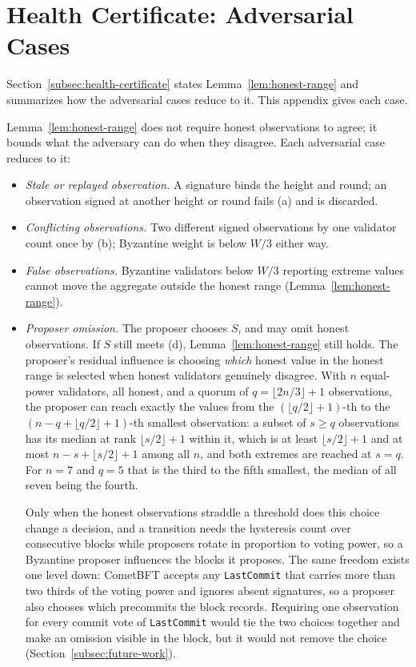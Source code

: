 \section{Health Certificate: Adversarial Cases}
\label{app:certificate}

Section~\ref{subsec:health-certificate} states Lemma~\ref{lem:honest-range} and summarizes how the adversarial cases reduce to it. This appendix gives each case.

Lemma~\ref{lem:honest-range} does not require honest observations to agree; it bounds what the
adversary can do when they disagree. Each adversarial case reduces to it:
\begin{itemize}
  \item \emph{Stale or replayed observation.} A signature binds the height
  and round; an observation signed at another height or round fails (a) and
  is discarded.
  \item \emph{Conflicting observations.} Two different signed observations
  by one validator count once by (b); Byzantine weight is below $W/3$ either
  way.
  \item \emph{False observations.} Byzantine validators below $W/3$
  reporting extreme values cannot move the aggregate outside the honest range
  (Lemma~\ref{lem:honest-range}).
  \item \emph{Proposer omission.} The proposer chooses $S$, and may omit
  honest observations. If $S$ still meets (d), Lemma~\ref{lem:honest-range} still holds. The
  proposer's residual influence is choosing \emph{which} honest value in the
  honest range is selected when honest validators genuinely disagree. With $n$
  equal-power validators, all honest, and a quorum of $q = \lfloor 2n/3 \rfloor + 1$
  observations, the proposer can reach exactly the values from the
  $(\lfloor q/2 \rfloor + 1)$-th to the $(n - q + \lfloor q/2 \rfloor + 1)$-th
  smallest observation: a subset of $s \ge q$ observations has its median at
  rank $\lfloor s/2 \rfloor + 1$ within it, which is at least $\lfloor s/2
  \rfloor + 1$ and at most $n - s + \lfloor s/2 \rfloor + 1$ among all $n$, and
  both extremes are reached at $s = q$. For $n{=}7$ and $q{=}5$ that is the third
  to the fifth smallest, the median of all seven being the fourth.

  Only when the
  honest observations straddle a threshold does this choice change a decision,
  and a transition needs the hysteresis count over consecutive blocks while
  proposers rotate in proportion to voting power, so a Byzantine proposer
  influences the blocks it proposes. The same
  freedom exists one level down: CometBFT accepts any \texttt{LastCommit} that
  carries more than two thirds of the voting power and ignores absent
  signatures, so a proposer also chooses which precommits the block records.
  Requiring one observation for every commit vote of \texttt{LastCommit} would tie
  the two choices together and make an omission visible in the block, but it
  would not remove the choice (Section~\ref{subsec:future-work}).


\end{itemize}

